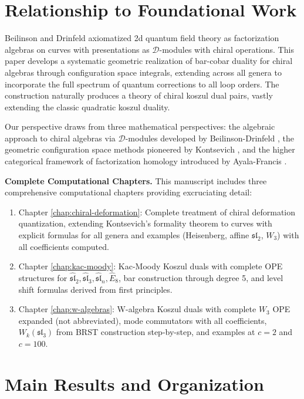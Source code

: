 \section{Relationship to Foundational Work}

Beilinson and Drinfeld \cite{BD04} axiomatized 2d quantum field theory as factorization algebras on curves with presentations as $\mathcal{D}$-modules with chiral operations. This paper develops a systematic geometric realization of bar-cobar duality for chiral algebras through configuration space integrals, extending across all genera to incorporate the full spectrum of quantum corrections to all loop orders. The construction naturally produces a theory of chiral koszul dual pairs, vastly extending the classic quadratic koszul duality.

Our perspective draws from three mathematical perspectives: the algebraic approach to chiral algebras via $\mathcal{D}$-modules developed by Beilinson-Drinfeld \cite{BD04}, the geometric configuration space methods pioneered by Kontsevich \cite{Kon94, Kon99}, and the higher categorical framework of factorization homology introduced by Ayala-Francis \cite{AF15}.

\medskip
\noindent
\textbf{Complete Computational Chapters.} This manuscript includes three comprehensive computational chapters providing excruciating detail:
\begin{enumerate}
\item Chapter \ref{chap:chiral-deformation}: Complete treatment of chiral deformation quantization, extending Kontsevich's formality theorem to curves with explicit formulas for all genera and examples (Heisenberg, affine $\mathfrak{sl}_2$, $W_3$) with all coefficients computed.
\item Chapter \ref{chap:kac-moody}: Kac-Moody Koszul duals with complete OPE structures for $\widehat{\mathfrak{sl}}_2, \widehat{\mathfrak{sl}}_3, \widehat{\mathfrak{sl}}_n, \widehat{E}_8$, bar construction through degree 5, and level shift formulas derived from first principles.
\item Chapter \ref{chap:w-algebras}: W-algebra Koszul duals with complete $W_3$ OPE expanded (not abbreviated), mode commutators with all coefficients, $W_k(\mathfrak{sl}_3)$ from BRST construction step-by-step, and examples at $c=2$ and $c=100$.
\end{enumerate}

\section{Main Results and Organization}

